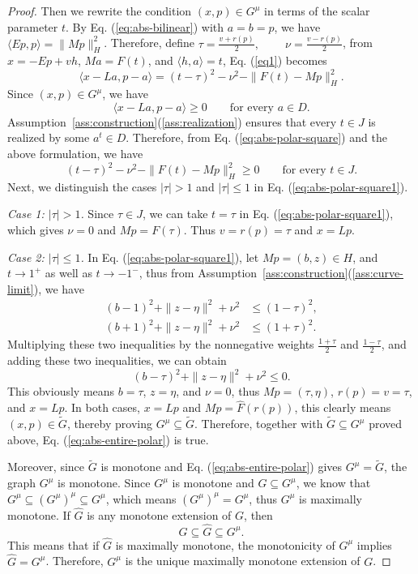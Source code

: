 \documentclass[11pt]{article}
\newcommand{\pair}[2]{\langle #1,#2\rangle}
\theoremstyle{definition}
\theoremstyle{remark}
\begin{document}
\begin{proof}
Then we rewrite the condition $(x,p)\in G^\mu$ in terms of the scalar parameter $t$. 
By Eq. (\ref{eq:abs-bilinear}) with $a=b=p$, we have $\pair{Ep}{p}=\|Mp\|_H^2$.  Therefore, define $\tau=\frac{v+r(p)}2,~\qquad \nu=\frac{v-r(p)}2$, from $x=-Ep+vh$, $Ma=F(t)$, and $\pair{h}{a}=t$, Eq. (\ref{eq1}) becomes 
\begin{equation}
\pair{x-La}{p-a}
=(t-\tau)^2-\nu^2-\|F(t)-Mp\|_H^2.
\label{eq:abs-polar-square}
\end{equation}
Since $(x,p)\in G^\mu$, we have 
\[
\pair{x-La}{p-a}\ge0
\qquad\text{for every }a\in D.
\]
Assumption~\ref{ass:construction}\textup{(\ref{ass:realization})} ensures that every $t\in J$ is realized by some $a^t\in D$. Therefore, from Eq. (\ref{eq:abs-polar-square}) and the above formulation, we have 
\begin{equation}
(t-\tau)^2-\nu^2-\|F(t)-Mp\|_H^2\ge0
\qquad\text{for every }t\in J.
\label{eq:abs-polar-square1}
\end{equation}
Next, we distinguish the cases $|\tau|>1$ and $|\tau|\le1$ in Eq. (\ref{eq:abs-polar-square1}).





\emph{Case 1: $|\tau|>1$.}  Since $\tau\in J$, we can take $t=\tau$ in Eq. (\ref{eq:abs-polar-square1}), which gives $\nu=0$ and $Mp=F(\tau)$. Thus $v=r(p)=\tau$ and $x=Lp$.

\emph{Case 2: $|\tau|\le1$.} In Eq. (\ref{eq:abs-polar-square1}), let $Mp=(b,z)\in H$, and $t\to1^+$ as well as $t\to-1^-$, thus from Assumption~\ref{ass:construction}\textup{(\ref{ass:curve-limit})}, we have 
\[
\begin{aligned}
(b-1)^2+\|z-\eta\|^2+\nu^2&\le(1-\tau)^2,\\
(b+1)^2+\|z-\eta\|^2+\nu^2&\le(1+\tau)^2.
\end{aligned}
\]
Multiplying these two inequalities by the nonnegative weights $\frac{1+\tau}{2}$ and $\frac{1-\tau}{2}$, and adding these two inequalities, we can obtain
\[
(b-\tau)^2+\|z-\eta\|^2+\nu^2\le0.
\]
This obviously means $b=\tau$, $z=\eta$, and $\nu=0$, thus $Mp=(\tau,\eta)$, $r(p)=v=\tau$, and $x=Lp$. 
In both cases, $x=Lp$ and $Mp=\widehat F(r(p))$, this clearly means $(x,p)\in\widetilde G$, thereby proving $G^\mu\subseteq\widetilde G$. Therefore, together with $\widetilde G\subseteq G^\mu$ proved above, Eq. (\ref{eq:abs-entire-polar}) is true.  





Moreover, since $\widetilde G$ is monotone and Eq. (\ref{eq:abs-entire-polar}) gives $G^\mu=\widetilde G$, the graph $G^\mu$ is monotone. Since $G^\mu$ is monotone and $G\subseteq G^\mu$, we know that $G^\mu\subseteq (G^\mu)^\mu\subseteq G^\mu$, which means $(G^\mu)^\mu=G^\mu$, thus $G^\mu$ is maximally monotone. 
If $\widehat G$ is any monotone extension of $G$, then 
\[
G\subseteq\widehat G\subseteq G^\mu.
\]
This means that if $\widehat G$ is maximally monotone, the monotonicity of $G^\mu$ implies $\widehat G=G^\mu$. Therefore, $G^\mu$ is the unique maximally monotone extension of $G$.  








\end{proof}
\end{document}
